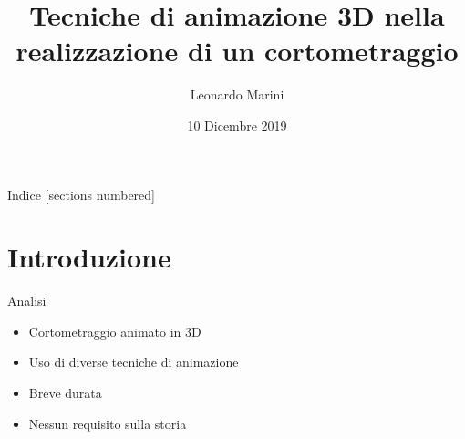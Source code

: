 \documentclass[10pt]{beamer}
\title{Tecniche di animazione 3D nella realizzazione di un cortometraggio}
\subtitle{}
\date{10 Dicembre 2019}
\author{Leonardo Marini}
\institute{ALMA MATER STUDIORUM - UNIVERSITÀ DI BOLOGNA}
\begin{document}
\maketitle

\begin{frame}{Indice}
  [sections numbered]
  \tableofcontents%
\end{frame}

\section[Intro]{Introduzione}

\begin{frame}{Analisi} 
      \begin{itemize}[<+- | alert@+>]								%
        \item Cortometraggio animato in 3D 					%
        \item Uso di diverse tecniche di animazione %
        \item Breve durata 													%
				\item Nessun requisito sulla storia 				%
      \end{itemize}
\end{frame}
\end{document}
